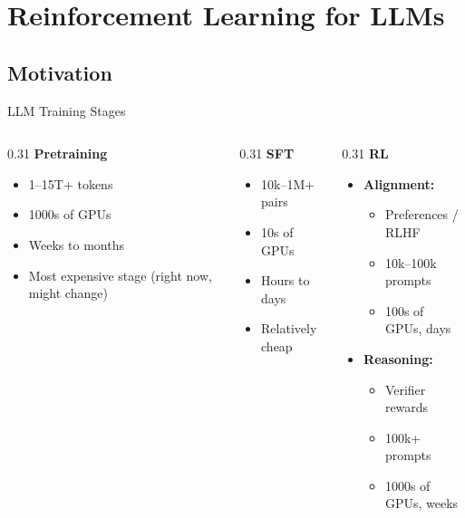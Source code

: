 
\section{Reinforcement Learning for LLMs}

\subsection{Motivation}

\begin{frame}{LLM Training Stages}

  \vspace{-0.2em}
  \begin{columns}[T]
    \begin{column}{0.31\textwidth}
      \textbf{\color{blue!60!black}Pretraining}
      \begin{itemize}[nosep]
        \item 1--15T+ tokens
        \item 1000s of GPUs
        \item Weeks to months
        \item Most expensive stage (right now, might change)
      \end{itemize}
    \end{column}
    \begin{column}{0.31\textwidth}
      \textbf{\color{green!50!black}SFT}
      \begin{itemize}[nosep]
        \item 10k--1M+ pairs
        \item 10s of GPUs
        \item Hours to days
        \item Relatively cheap
      \end{itemize}
    \end{column}
    \begin{column}{0.31\textwidth}
      \textbf{\color{orange!70!black}RL}
      \begin{itemize}[nosep]
        \item \textbf{Alignment:}
          \begin{itemize}[nosep]
            \item Preferences / RLHF
            \item 10k--100k prompts
            \item 100s of GPUs, days
          \end{itemize}
        \item \textbf{Reasoning:}
          \begin{itemize}[nosep]
            \item Verifier rewards
            \item 100k+ prompts
            \item 1000s of GPUs, weeks
          \end{itemize}
      \end{itemize}
    \end{column}
  \end{columns}
\end{frame}

